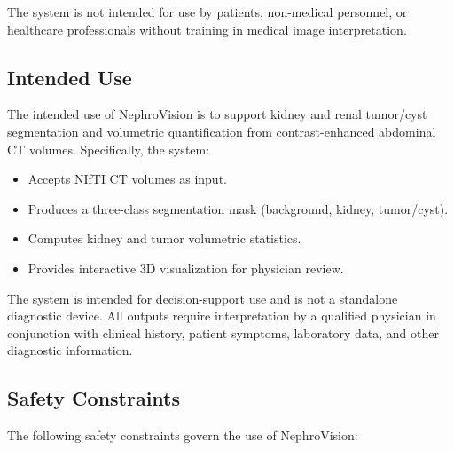 The system is not intended for use by patients, non-medical personnel, or healthcare professionals without training in medical image interpretation.

\subsection{Intended Use}

The intended use of NephroVision is to support kidney and renal tumor/cyst segmentation and volumetric quantification from contrast-enhanced abdominal CT volumes. Specifically, the system:

\begin{itemize}
    \item Accepts NIfTI CT volumes as input.
    \item Produces a three-class segmentation mask (background, kidney, tumor/cyst).
    \item Computes kidney and tumor volumetric statistics.
    \item Provides interactive 3D visualization for physician review.
\end{itemize}

The system is intended for decision-support use and is not a standalone diagnostic device. All outputs require interpretation by a qualified physician in conjunction with clinical history, patient symptoms, laboratory data, and other diagnostic information.

\subsection{Safety Constraints}

The following safety constraints govern the use of NephroVision:

